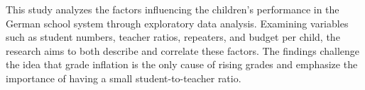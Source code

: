 
This study analyzes the factors influencing the children's performance in the German school system through exploratory data analysis. Examining variables such as student numbers, teacher ratios, repeaters, and budget per child, the research aims to both describe and correlate these factors. The findings challenge the idea that grade inflation is the only cause of rising grades and emphasize the importance of having a small student-to-teacher ratio.